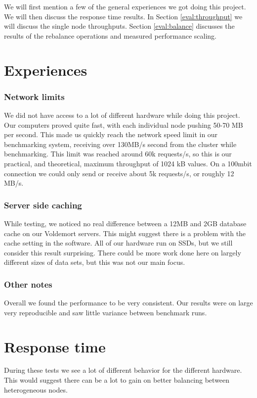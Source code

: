 
We will first mention a few of the general experiences we got doing this project.
We will then discuss the response time results. In Section \ref{eval:throughput} we will discuss the single node throughputs.
Section \ref{eval:balance} discusses the results of the rebalance operations and measured performance scaling.

\section{Experiences}
\subsubsection{Network limits}
We did not have access to a lot of different hardware while doing this project. Our computers proved quite fast, with each individual node pushing 50-70 MB per second. This made us quickly reach the network speed limit in our benchmarking system, receiving over 130MB/s second from the cluster while benchmarking. This limit was reached around 60k requests/s, so this is our practical, and theoretical, maximum throughput of 1024 kB values. On a 100mbit connection we could only send or receive about 5k requests/s, or roughly 12 MB/s. 

\subsubsection{Server side caching}
While testing, we noticed no real difference between a 12MB and 2GB database cache on our Voldemort servers. This might suggest there is a problem with the cache setting in the software. All of our hardware run on SSDs, but we still consider this result surprising. There could be more work done here on largely different sizes of data sets, but this was not our main focus.

\subsubsection{Other notes}
Overall we found the performance to be very consistent. Our results were on large very reproducible and saw little variance between benchmark runs.

\section{Response time}
During these tests we see a lot of different behavior for the different hardware. This would suggest there can be a lot to gain on better balancing between heterogeneous nodes.


